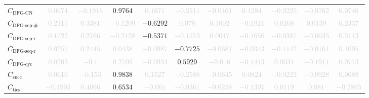 \documentclass{standalone}
\newcommand{\dfgcycnumbername}{\text{DFG-CN}}
\newcommand{\dfgcycnumber}{C_{\dfgcycnumbername}}
\newcommand{\dfgsepnumname}{\text{DFG-sep-\#}}
\newcommand{\dfgsepnum}{C_{\dfgsepnumname}}
\newcommand{\dfgseprationame}{\text{DFG-sep-r}}
\newcommand{\dfgsepratio}{C_{\dfgseprationame}}
\newcommand{\dfgseqrationame}{\text{DFG-seq-r}}
\newcommand{\dfgseqratio}{C_{\dfgseqrationame}}
\newcommand{\dfgcycname}{\text{DFG-cyc}}
\newcommand{\dfgcyc}{C_{\dfgcycname}}
\newcommand{\numberofneighborhoodsname}{\text{succ}}
\newcommand{\numberofneighborhoods}{C_{\numberofneighborhoodsname}}
\newcommand{\numberoftiesname}{\text{ties}}
\newcommand{\numberofties}{C_{\numberoftiesname}}
\begin{document}
\begin{tabular}{lcccccccccc}
$\dfgcycnumber$ & \textcolor{lightgray}{$0.0674$} & \textcolor{lightgray}{$-0.1916$} & $0.9764$ & \textcolor{lightgray}{$0.1671$} & \textcolor{lightgray}{$-0.2511$} & \textcolor{lightgray}{$-0.0461$} & \textcolor{lightgray}{$0.1284$} & \textcolor{lightgray}{$-0.0225$} & \textcolor{lightgray}{$-0.0762$} & \textcolor{lightgray}{$0.0746$} \\ 
$\dfgsepnum$ & \textcolor{lightgray}{$0.2311$} & \textcolor{lightgray}{$0.3381$} & \textcolor{lightgray}{$-0.1209$} & $-0.6292$ & \textcolor{lightgray}{$0.078$} & \textcolor{lightgray}{$0.1002$} & \textcolor{lightgray}{$-0.1921$} & \textcolor{lightgray}{$0.0208$} & \textcolor{lightgray}{$0.0139$} & \textcolor{lightgray}{$0.2337$} \\ 
$\dfgsepratio$ & \textcolor{lightgray}{$0.1722$} & \textcolor{lightgray}{$0.2766$} & \textcolor{lightgray}{$-0.2128$} & $-0.5371$ & \textcolor{lightgray}{$-0.1573$} & \textcolor{lightgray}{$0.0047$} & \textcolor{lightgray}{$-0.1656$} & \textcolor{lightgray}{$-0.0387$} & \textcolor{lightgray}{$-0.0635$} & \textcolor{lightgray}{$0.3143$} \\ 
$\dfgseqratio$ & \textcolor{lightgray}{$0.0257$} & \textcolor{lightgray}{$0.2445$} & \textcolor{lightgray}{$0.0438$} & \textcolor{lightgray}{$-0.0987$} & $-0.7725$ & \textcolor{lightgray}{$-0.0681$} & \textcolor{lightgray}{$-0.0343$} & \textcolor{lightgray}{$-0.1142$} & \textcolor{lightgray}{$-0.0161$} & \textcolor{lightgray}{$0.1095$} \\ 
$\dfgcyc$ & \textcolor{lightgray}{$0.0203$} & \textcolor{lightgray}{$-0.1$} & \textcolor{lightgray}{$0.2709$} & \textcolor{lightgray}{$-0.0934$} & $0.5929$ & \textcolor{lightgray}{$-0.016$} & \textcolor{lightgray}{$-0.1413$} & \textcolor{lightgray}{$0.0031$} & \textcolor{lightgray}{$-0.1911$} & \textcolor{lightgray}{$0.0773$} \\ 
$\numberofneighborhoods$ & \textcolor{lightgray}{$0.0616$} & \textcolor{lightgray}{$-0.153$} & $0.9838$ & \textcolor{lightgray}{$0.1527$} & \textcolor{lightgray}{$-0.2588$} & \textcolor{lightgray}{$-0.0645$} & \textcolor{lightgray}{$0.0824$} & \textcolor{lightgray}{$-0.0223$} & \textcolor{lightgray}{$-0.0928$} & \textcolor{lightgray}{$0.0689$} \\ 
$\numberofties$ & \textcolor{lightgray}{$-0.1903$} & \textcolor{lightgray}{$0.4066$} & $0.6534$ & \textcolor{lightgray}{$-0.061$} & \textcolor{lightgray}{$-0.0361$} & \textcolor{lightgray}{$-0.0258$} & \textcolor{lightgray}{$-0.1307$} & \textcolor{lightgray}{$0.0119$} & \textcolor{lightgray}{$0.081$} & \textcolor{lightgray}{$-0.2865$} \\ 

\end{tabular}
\end{document}
